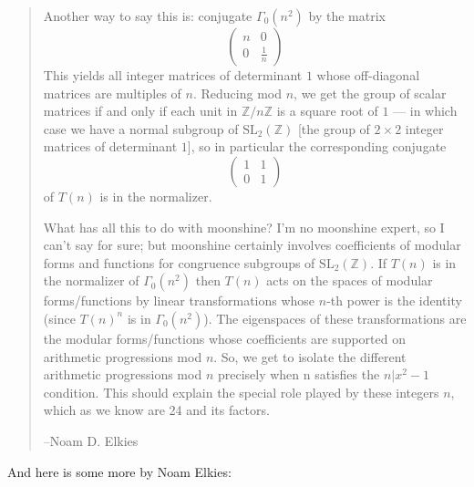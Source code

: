 \documentclass{article}
\begin{document}
\begin{quote}
Another way to say this is: conjugate \(\Gamma_0(n^2)\) by the matrix
\[\left(\begin{array}{cc}n&0\\0&\frac1n\end{array}\right)\] This yields
all integer matrices of determinant \(1\) whose off-diagonal matrices
are multiples of \(n\). Reducing mod \(n\), we get the group of scalar
matrices if and only if each unit in \(\mathbb{Z}/n\mathbb{Z}\) is a
square root of \(1\) --- in which case we have a normal subgroup of
\(\mathrm{SL}_2(\mathbb{Z})\) {[}the group of \(2\times2\) integer
matrices of determinant \(1\){]}, so in particular the corresponding
conjugate \[\left(\begin{array}{cc}1&1\\0&1\end{array}\right)\] of
\(T(n)\) is in the normalizer.

What has all this to do with moonshine? I'm no moonshine expert, so I
can't say for sure; but moonshine certainly involves coefficients of
modular forms and functions for congruence subgroups of
\(\mathrm{SL}_2(\mathbb{Z})\). If \(T(n)\) is in the normalizer of
\(\Gamma_0(n^2)\) then \(T(n)\) acts on the spaces of modular
forms/functions by linear transformations whose \(n\)-th power is the
identity (since \(T(n)^n\) is in \(\Gamma_0(n^2)\)). The eigenspaces of
these transformations are the modular forms/functions whose coefficients
are supported on arithmetic progressions mod \(n\). So, we get to
isolate the different arithmetic progressions mod \(n\) precisely when n
satisfies the \(n|x^2-1\) condition. This should explain the special
role played by these integers \(n\), which as we know are 24 and its
factors.

--Noam D. Elkies
\end{quote}

And here is some more by Noam Elkies:
\end{document}
